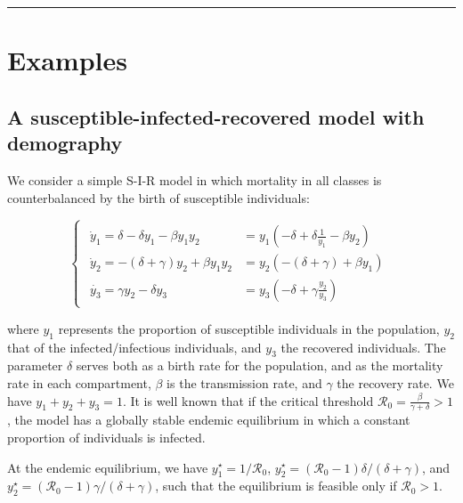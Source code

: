 \documentclass{article}
\begin{document}
\begin{center}\rule{0.5\linewidth}{0.5pt}\end{center}

\hypertarget{examples}{%
\section{Examples}\label{examples}}

\hypertarget{a-susceptible-infected-recovered-model-with-demography}{%
\subsection{A susceptible-infected-recovered model with
demography}\label{a-susceptible-infected-recovered-model-with-demography}}

\label{sec:sir}

We consider a simple S-I-R model in which mortality in all classes is
counterbalanced by the birth of susceptible individuals:

\begin{equation}
\label{eq:sir}
\begin{cases}
\begin{aligned}
\dot{y}_1 = \delta - \delta y_1 - \beta y_1 y_2 &= y_1 \left(-\delta + \delta \frac{1}{y_1} - \beta y_2 \right)\\
\dot{y}_2 = - (\delta + \gamma) y_2 + \beta y_1 y_2 &= y_2 \left(-(\delta + \gamma) + \beta y_1 \right)\\
\dot{y_3} = \gamma y_2 - \delta y_3 &= y_3 \left(-\delta + \gamma \frac{y_2}{y_3} \right)
\end{aligned}
\end{cases}
\end{equation}

where \(y_1\) represents the proportion of susceptible individuals in
the population, \(y_2\) that of the infected/infectious individuals, and
\(y_3\) the recovered individuals. The parameter \(\delta\) serves both
as a birth rate for the population, and as the mortality rate in each
compartment, \(\beta\) is the transmission rate, and \(\gamma\) the
recovery rate. We have \(y_1 + y_2 + y_3 = 1\). It is well known that if
the critical threshold
\(\mathcal R_0 = \frac{\beta}{\gamma + \delta} > 1\), the model has a
globally stable endemic equilibrium in which a constant proportion of
individuals is infected.

At the endemic equilibrium, we have \(y_1^\star = 1 / \mathcal R_0\),
\(y_2^\star = (\mathcal R_0 - 1) \delta / (\delta + \gamma)\), and
\(y_2^\star = (\mathcal R_0 - 1) \gamma / (\delta + \gamma)\), such that
the equilibrium is feasible only if \(\mathcal R_0 >1\).
\end{document}

